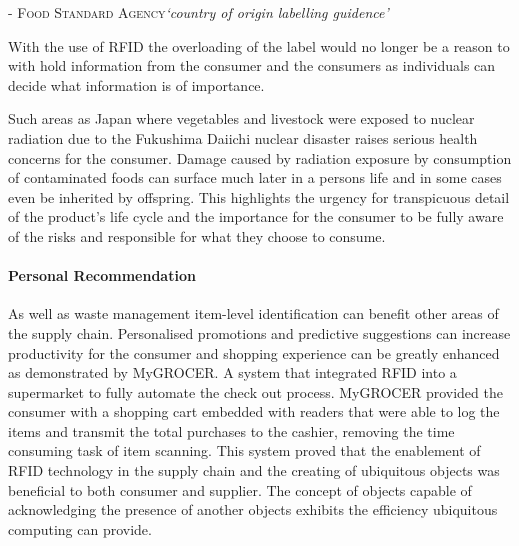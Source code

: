 \documentclass[a4paper, 11pt]{article}
\begin{document}
\vspace{\baselineskip}
 {\textsc{- Food Standard Agency}\textit{`country of origin labelling guidence'}
\vspace{\baselineskip}

With the use of RFID the overloading of the label would no longer be a reason to with hold information from the consumer and the consumers as individuals can decide what information is of importance.

Such areas as Japan where vegetables and livestock were exposed to nuclear radiation due to the Fukushima Daiichi nuclear disaster raises serious health concerns for the consumer. Damage caused by radiation exposure by consumption of contaminated foods can surface much later in a persons life\cite{fukushima} and in some cases even be inherited by offspring. This highlights the urgency for transpicuous detail of the product's life cycle and the importance for the consumer to be fully aware of the risks and responsible for what they choose to consume.

\paragraph{Personal Recommendation} As well as waste management item-level identification can benefit other areas of the supply chain. Personalised promotions and predictive suggestions can increase productivity for the consumer and shopping experience can be greatly enhanced as demonstrated by MyGROCER\cite{myGrocer}. A system that integrated RFID into a supermarket to fully automate the check out process. MyGROCER provided the consumer with a shopping cart embedded with readers that were able to log the items and transmit the total purchases to the cashier, removing the time consuming task of item scanning. This system proved that the enablement of RFID technology in the supply chain and the creating of ubiquitous objects was beneficial to both consumer and supplier. The concept of objects capable of acknowledging the presence of another objects exhibits the efficiency ubiquitous computing can provide.

}
\end{document}
